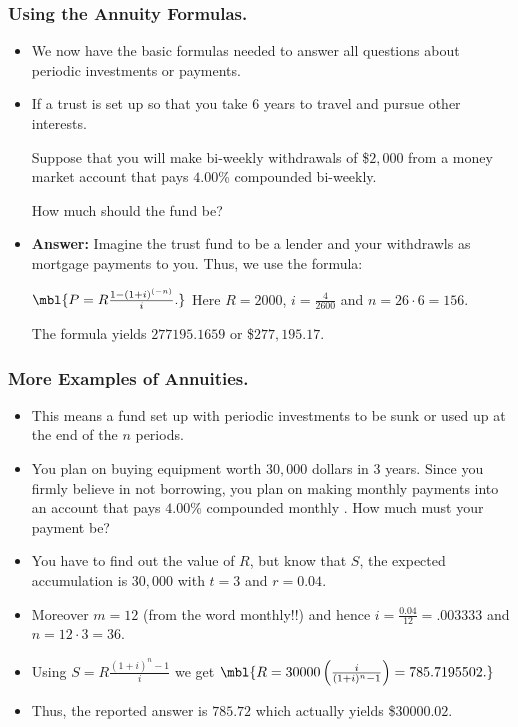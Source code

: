 %



\begin{frame}%
 \frametitle{Using the Annuity Formulas.}
  \begin{itemize}%
 
\item 
We now have the basic formulas needed to answer all questions about
periodic investments or payments.

\item {} If a trust is set up
so that you take  $6$ years to travel and pursue other interests.

Suppose that you will make  bi-weekly withdrawals of \$$2,000$ from a
money market account that pays $4.00$\% compounded bi-weekly.

How much should the fund be?

\item {\bf Answer:} Imagine the trust fund to be a lender and your
withdrawls as mortgage payments to you. Thus, we use the formula:

$\mbl{P = R\frac{1-(1+i)^{(-n)}}{i}.}$
Here $R=2000$, $i=\frac{4}{2600}$ and $n=26\cdot 6 = 156$.

The formula yields $277195.1659$ or \$$277,195.17$.
 

\end{itemize}
\end{frame}

%



\begin{frame}%
 \frametitle{More Examples of Annuities.}
  \begin{itemize}%
 
\item
{} This means a fund set up with periodic investments
to be sunk or used up at the end of the $n$ periods.

\item {}
You plan on buying equipment worth $30,000$ dollars in $3$ years.
 Since you firmly believe in not borrowing, you plan on making
 monthly payments into an account that pays $4.00$\% compounded monthly .
 How much must your payment be?

\item You have to find out the value of $R$, but know that $S$, the
expected accumulation is $30,000$ with $t=3$ and $r=0.04$.

\item Moreover $m=12$ (from the word monthly!!) and hence
$i=\frac{0.04}{12}=.003333$ and $n=12\cdot 3 = 36$.

\item  Using
$S=R \frac{(1+i)^n -1}{i}$ 
 we get
$\mbl{R = 30000\left( \frac{i}{(1+i)^n -1}\right) = 785.7195502.}$

\item Thus, the reported answer is $785.72$ which actually yields
\$$30000.02$.

\end{itemize}
\end{frame}

